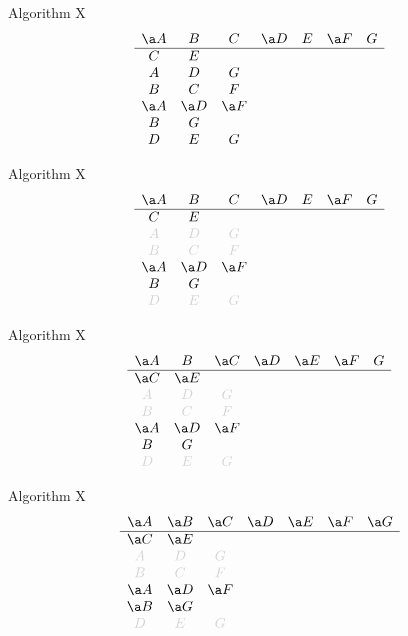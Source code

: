 \documentclass[xcolor=svgnames]{beamer}
\begin{document}
%
\begin{frame}{Algorithm X}
\Large\boldmath
  $$
  \begin{array}{ccccccc}
    \a A & B & C & \a D & E & \a F & G\\
    \hline
    C & E &&&&&\\
    A & D & G &&&&\\
    B & C & F &&&&\\
    \a A & \a D & \a F &&&&\\
    B & G &&&&&\\
    D & E & G &&&&
  \end{array}
  $$
\end{frame}

%
\begin{frame}{Algorithm X}
\Large\boldmath
  $$
  \begin{array}{ccccccc}
    \a A & B & C & \a D & E & \a F & G\\
    \hline
    C & E &&&&&\\
    \lg A & \lg D & \lg G &&&&\\
    \lg B & \lg C & \lg F &&&&\\
    \a A & \a D & \a F &&&&\\
    B & G &&&&&\\
    \lg D & \lg E & \lg G &&&&
  \end{array}
  $$
\end{frame}

%
\begin{frame}{Algorithm X}
\Large\boldmath
  $$
  \begin{array}{ccccccc}
    \a A & B & \a C & \a D & \a E & \a F & G\\
    \hline
    \a C & \a E &&&&&\\
    \lg A & \lg D & \lg G &&&&\\
    \lg B & \lg C & \lg F &&&&\\
    \a A & \a D & \a F &&&&\\
    B & G &&&&&\\
    \lg D & \lg E & \lg G &&&&
  \end{array}
  $$
\end{frame}

%
\begin{frame}{Algorithm X}
\Large\boldmath
$$
  \begin{array}{ccccccc}
    \a A & \a B & \a C & \a D & \a E & \a F & \a G\\
    \hline
    \a C & \a E &&&&&\\
    \lg A & \lg D & \lg G &&&&\\
    \lg B & \lg C & \lg F &&&&\\
    \a A & \a D & \a F &&&&\\
    \a B & \a G &&&&&\\
    \lg D & \lg E & \lg G &&&&
  \end{array}
  $$
\end{frame}
\end{document}

